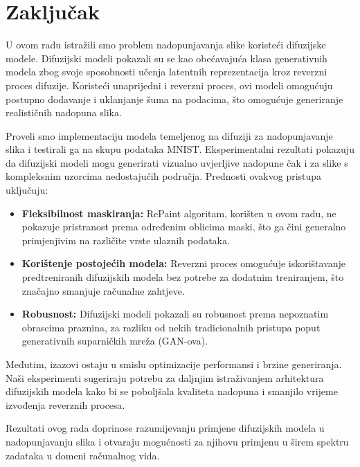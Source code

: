 \documentclass[10pt, a4paper, croatian]{article}
\begin{document}
\section{Zaključak}

U ovom radu istražili smo problem nadopunjavanja slike koristeći difuzijske modele. Difuzijski modeli pokazali su se kao obećavajuća klasa generativnih modela zbog svoje sposobnosti učenja latentnih reprezentacija kroz reverzni proces difuzije. Koristeći unaprijedni i reverzni proces, ovi modeli omogućuju postupno dodavanje i uklanjanje šuma na podacima, što omogućuje generiranje realističnih nadopuna slika.

Proveli smo implementaciju modela temeljenog na difuziji za nadopunjavanje slika i testirali ga na skupu podataka MNIST. Eksperimentalni rezultati pokazuju da difuzijski modeli mogu generirati vizualno uvjerljive nadopune čak i za slike s kompleksnim uzorcima nedostajućih područja. Prednosti ovakvog pristupa uključuju:

\begin{itemize}
    \item \textbf{Fleksibilnost maskiranja:} RePaint algoritam, korišten u ovom radu, ne pokazuje pristranost prema određenim oblicima maski, što ga čini generalno primjenjivim na različite vrste ulaznih podataka.
    \item \textbf{Korištenje postojećih modela:} Reverzni proces omogućuje iskorištavanje predtreniranih difuzijskih modela bez potrebe za dodatnim treniranjem, što značajno smanjuje računalne zahtjeve.
    \item \textbf{Robusnost:} Difuzijski modeli pokazali su robusnost prema nepoznatim obrascima praznina, za razliku od nekih tradicionalnih pristupa poput generativnih suparničkih mreža (GAN-ova).
\end{itemize}

Međutim, izazovi ostaju u smislu optimizacije performansi i brzine generiranja. Naši eksperimenti sugeriraju potrebu za daljnjim istraživanjem arhitektura difuzijskih modela kako bi se poboljšala kvaliteta nadopuna i smanjilo vrijeme izvođenja reverznih procesa.

Rezultati ovog rada doprinose razumijevanju primjene difuzijskih modela u nadopunjavanju slika i otvaraju mogućnosti za njihovu primjenu u širem spektru zadataka u domeni računalnog vida.




 
\end{document}
